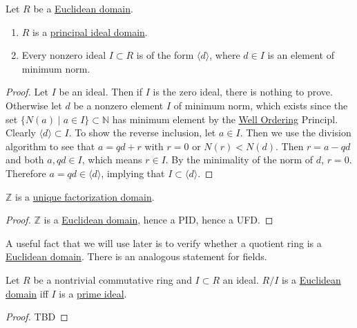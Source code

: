   \begin{theorem}
    \label{thm:euclidean-domains-are-pids}
    Let $R$ be a \hyperref[def:euclidean-domain]{Euclidean domain}. 
    \begin{enumerate}
      \item $R$ is a \hyperref[def:principal-ideal-domain]{principal ideal domain}. 
      \item Every nonzero ideal $I \subset R$ is of the form $\langle d \rangle$, where $d \in I$ is an element of minimum norm. 
    \end{enumerate}
  \end{theorem}
  \begin{proof}
    Let $I$ be an ideal. Then if $I$ is the zero ideal, there is nothing to prove. Otherwise let $d$ be a nonzero element $I$ of minimum norm, which exists since the set $\{N(a) \mid a \in I \} \subset \mathbb{N}$ has minimum element by the \hyperref[st-thm:well-ordering-principle]{Well Ordering} Principl. Clearly $\langle d \rangle \subset I$. To show the reverse inclusion, let $a \in I$. Then we use the division algorithm to see that $a = qd + r$ with $r = 0$ or $N(r) < N(d)$. Then $r = a - qd$ and both $a, qd \in I$, which means $r \in I$. By the minimality of the norm of $d$, $r = 0$. Therefore $a = qd \in \langle d \rangle$, implying that $I \subset \langle d \rangle$. 
  \end{proof}

  \begin{corollary}
    \label{thm:fundamental-theorem-of-arithmetic}
    $\mathbb{Z}$ is a \hyperref[def:unique-factorization-domain]{unique factorization domain}. 
  \end{corollary}
  \begin{proof}
    $\mathbb{Z}$ is a \hyperref[def:euclidean-domain]{Euclidean domain}, hence a PID, hence a UFD. 
  \end{proof}

  A useful fact that we will use later is to verify whether a quotient ring is a \hyperref[def:euclidean-domain]{Euclidean domain}. There is an analogous statement for fields. 

  \begin{theorem}
    \label{thm:quotient-rings-as-euclidean-domains}
    Let $R$ be a nontrivial commutative ring and $I \subset R$ an ideal. $R/I$ is a \hyperref[def:euclidean-domain]{Euclidean domain} iff $I$ is a \hyperref[def:prime-ideal]{prime ideal}. 
  \end{theorem}
  \begin{proof}
    TBD
  \end{proof}

